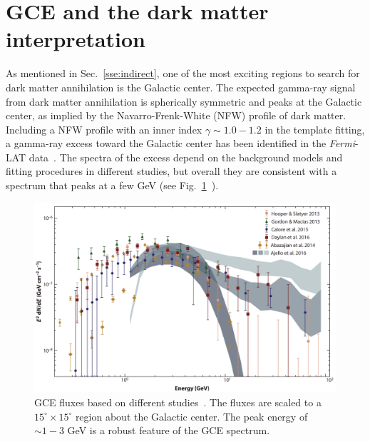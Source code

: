 \documentclass[doublespace,nopageskip]{VTthesis}
\begin{document}
\section{GCE and the dark matter interpretation}\label{se:GCEdm}

As mentioned in Sec.~\ref{sse:indirect}, one of the most exciting regions to search for dark matter annihilation is the Galactic center. The expected gamma-ray signal from dark matter annihilation is spherically symmetric and peaks at the Galactic center, as implied by the Navarro-Frenk-White (NFW) profile of dark matter. Including a NFW profile with an inner index $\gamma \sim 1.0 - 1.2$ in the template fitting, a gamma-ray excess toward the Galactic center has been identified in the \textit{Fermi}-LAT data~\cite{2009arXiv0910.2998G, 2009arXiv0912.3828V,2011PhLB..697..412H,2012PhRvD..86h3511A,2013PhRvD..88h3521G,2014PhRvD..89f3515M,2013PDU.....2..118H,2014PhRvD..90b3526A,2016PDU....12....1D,2015JCAP...03..038C,2015PhRvD..91l3010Z,2016ApJ...819...44A,2017ApJ...840...43A}. The spectra of the excess depend on the background models and fitting procedures in different studies, but overall they are consistent with a spectrum that peaks at a few GeV (see Fig.~\ref{fig:gce_spectra}~\cite{Murgia:2020dzu}).
\begin{figure}[htb]
    \centering
    \includegraphics[width=\textwidth]{Figures/Intro/gcespectrum.png}
    \caption{GCE fluxes based on different studies~\cite{Murgia:2020dzu}. The fluxes are scaled to a $15^\circ \times 15^\circ$ region about the Galactic center. The peak energy of $\sim 1 - 3$ GeV is a robust feature of the GCE spectrum.}
    \label{fig:gce_spectra}
\end{figure}
\end{document}
